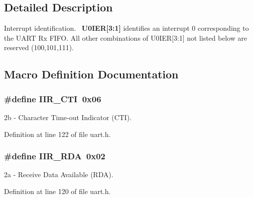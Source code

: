 \subsection{Detailed Description}
Interrupt identification.~\newline
 {\bfseries  U0\+I\+ER\mbox{[}3\+:1\mbox{]} } identifies an interrupt 0 corresponding to the U\+A\+RT Rx F\+I\+FO. All other combinations of U0\+I\+ER\mbox{[}3\+:1\mbox{]} not listed below are reserved (100,101,111). 



\subsection{Macro Definition Documentation}
\subsubsection[{\texorpdfstring{I\+I\+R\+\_\+\+C\+TI}{IIR_CTI}}]{\setlength{\rightskip}{0pt plus 5cm}\#define I\+I\+R\+\_\+\+C\+TI~0x06}\hypertarget{group___i_n_t_i_d_ga4842d23857b5599cf59365f23a46722f}{}\label{group___i_n_t_i_d_ga4842d23857b5599cf59365f23a46722f}


2b -\/ Character Time-\/out Indicator (C\+TI). 



Definition at line 122 of file uart.\+h.

\subsubsection[{\texorpdfstring{I\+I\+R\+\_\+\+R\+DA}{IIR_RDA}}]{\setlength{\rightskip}{0pt plus 5cm}\#define I\+I\+R\+\_\+\+R\+DA~0x02}\hypertarget{group___i_n_t_i_d_ga80925dd3aa4708e148a9d63088b4758d}{}\label{group___i_n_t_i_d_ga80925dd3aa4708e148a9d63088b4758d}


2a -\/ Receive Data Available (R\+DA). 



Definition at line 120 of file uart.\+h.

